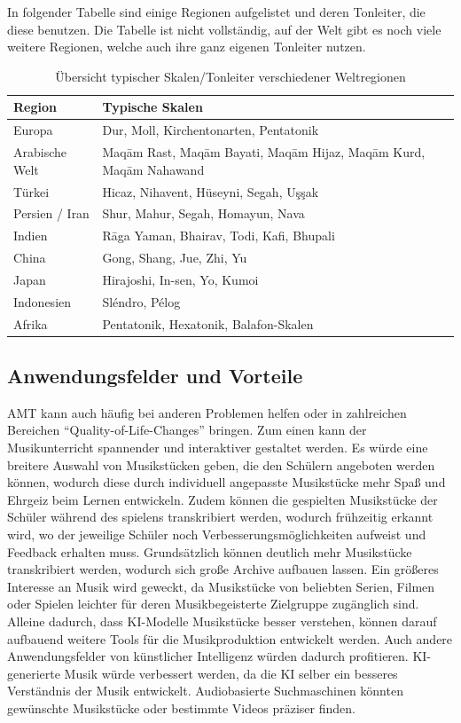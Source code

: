 In folgender Tabelle sind einige Regionen aufgelistet und deren Tonleiter, die diese benutzen.
Die Tabelle ist nicht vollständig, auf der Welt gibt es noch viele weitere Regionen, welche auch ihre ganz eigenen Tonleiter nutzen.

\begin{table}[H]
    \centering
    \begin{tabular}{|l|p{10cm}|}
    \hline
    \textbf{Region} & \textbf{Typische Skalen} \\ \hline
    Europa & Dur, Moll, Kirchentonarten, Pentatonik \\
    \hline
    Arabische Welt & Maqām Rast, Maqām Bayati, Maqām Hijaz, Maqām Kurd, Maqām Nahawand \\
    \hline
    Türkei & Hicaz, Nihavent, Hüseyni, Segah, Uşşak \\
    \hline
    Persien / Iran & Shur, Mahur, Segah, Homayun, Nava \\
    \hline
    Indien & Rāga Yaman, Bhairav, Todi, Kafi, Bhupali \\
    \hline
    China & Gong, Shang, Jue, Zhi, Yu \\
    \hline
    Japan & Hirajoshi, In-sen, Yo, Kumoi \\
    \hline
    Indonesien & Sléndro, Pélog \\
    \hline
    Afrika & Pentatonik, Hexatonik, Balafon-Skalen \\
    \hline
    \end{tabular}
    \caption{Übersicht typischer Skalen/Tonleiter verschiedener Weltregionen}
\end{table}

\subsection{Anwendungsfelder und Vorteile}\label{subsec:praktisch}
AMT kann auch häufig bei anderen Problemen helfen
oder in zahlreichen Bereichen \enquote{Quality-of-Life-Changes} bringen.
Zum einen kann der Musikunterricht spannender und interaktiver gestaltet werden.
Es würde eine breitere Auswahl von Musikstücken geben, die den Schülern angeboten werden können,
wodurch diese durch individuell angepasste Musikstücke mehr Spaß und Ehrgeiz beim Lernen entwickeln.
Zudem können die gespielten Musikstücke der Schüler während des spielens transkribiert werden,
wodurch frühzeitig erkannt wird, wo der jeweilige Schüler noch Verbesserungsmöglichkeiten aufweist und Feedback erhalten muss.
Grundsätzlich können deutlich mehr Musikstücke transkribiert werden,
wodurch sich große Archive aufbauen lassen.
Ein größeres Interesse an Musik wird geweckt, da Musikstücke von beliebten Serien, Filmen oder Spielen
leichter für deren Musikbegeisterte Zielgruppe zugänglich sind.
Alleine dadurch, dass KI-Modelle Musikstücke besser verstehen,
können darauf aufbauend weitere Tools für die Musikproduktion entwickelt werden.
Auch andere Anwendungsfelder von künstlicher Intelligenz würden dadurch profitieren.
KI-generierte Musik würde verbessert werden, da die KI selber ein besseres Verständnis der Musik entwickelt.
Audiobasierte Suchmaschinen könnten gewünschte Musikstücke oder bestimmte Videos präziser finden.

